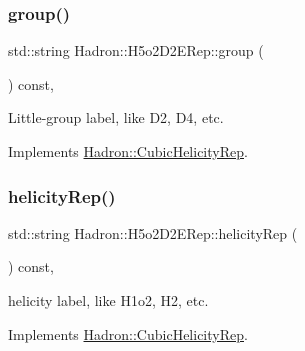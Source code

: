 \mbox{\label{structHadron_1_1H5o2D2ERep_aba8c064b1c4731c813d921e68d04d021}} 
\subsubsection{\texorpdfstring{group()}{group()}\hspace{0.1cm}{\footnotesize\ttfamily [5/5]}}
{\footnotesize\ttfamily std\+::string Hadron\+::\+H5o2\+D2\+E\+Rep\+::group (\begin{DoxyParamCaption}{ }\end{DoxyParamCaption}) const\hspace{0.3cm}{\ttfamily [inline]}, {\ttfamily [virtual]}}

Little-\/group label, like D2, D4, etc. 

Implements \mbox{\hyperlink{structHadron_1_1CubicHelicityRep_a101a7d76cd8ccdad0f272db44b766113}{Hadron\+::\+Cubic\+Helicity\+Rep}}.

\mbox{\label{structHadron_1_1H5o2D2ERep_a88ae729517bb24fb9254ad77081633af}} 
\subsubsection{\texorpdfstring{helicityRep()}{helicityRep()}\hspace{0.1cm}{\footnotesize\ttfamily [1/3]}}
{\footnotesize\ttfamily std\+::string Hadron\+::\+H5o2\+D2\+E\+Rep\+::helicity\+Rep (\begin{DoxyParamCaption}{ }\end{DoxyParamCaption}) const\hspace{0.3cm}{\ttfamily [inline]}, {\ttfamily [virtual]}}

helicity label, like H1o2, H2, etc. 

Implements \mbox{\hyperlink{structHadron_1_1CubicHelicityRep_af1096946b7470edf0a55451cc662f231}{Hadron\+::\+Cubic\+Helicity\+Rep}}.

\mbox{\label{structHadron_1_1H5o2D2ERep_a88ae729517bb24fb9254ad77081633af}} 
